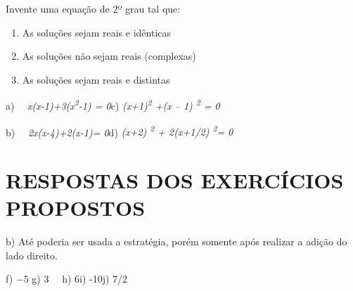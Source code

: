 \begin{exercicios}
	\item{ Invente uma equação de 2º grau tal que:}

\begin{enumerate}[label=\alph*)]
	\item As soluções sejam reais e idênticas

	\item As soluções não sejam reais (complexas)

	\item As soluções sejam reais e distintas
\end{enumerate}


a)~~ \textit{x(x-1)+3(x\textsuperscript{2}-1) = 0\quad \quad }\quad c)  \textit{(x+1)\textsuperscript{2} +(x – 1)\textsuperscript{ 2} = 0}

b)~~ \textit{2x(x-4)+2(x-1)= 0\quad \quad }\quad d) \textit{(x+2)\textsuperscript{ 2} + 2(x+1/2)\textsuperscript{ 2}= 0}

\end{exercicios}

\section{RESPOSTAS DOS EXERCÍCIOS PROPOSTOS}

\begin{respostas}{3}

	b) Até poderia ser usada a estratégia, porém somente após realizar a adição do lado direito.



    f)  \( -5 \) \quad \quad g) 3\quad ~~ h) 6\quad \quad i) -10\quad \quad j) 7/2\quad








\end{respostas}

